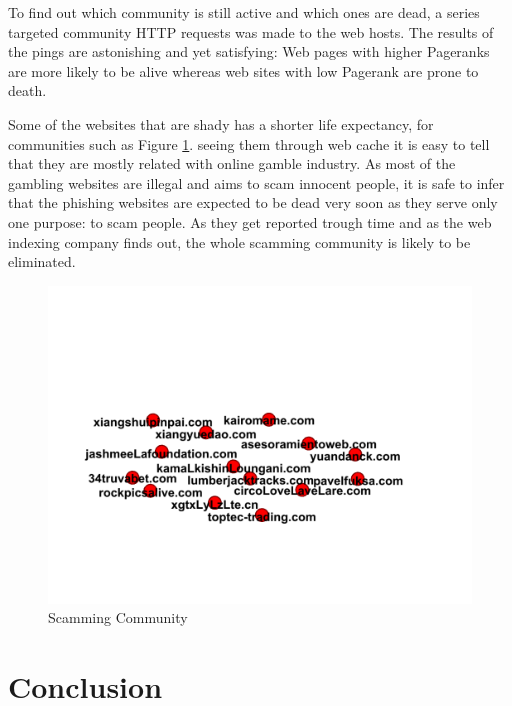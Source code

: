 \documentclass[conference]{IEEEtran}
\begin{document}
To find out which community is still active and which ones are dead, 
a series targeted community HTTP requests was made to the web hosts. 
The results of the pings are astonishing and yet satisfying: 
Web pages with higher Pageranks\cite{ilprints422} are more likely to be alive whereas web sites with low Pagerank are prone to death.

Some of the websites that are shady has a shorter life expectancy, 
for communities such as Figure \ref{fig:dead}.
seeing them through web cache it is easy to tell that they are mostly related with online gamble industry. 
As most of the gambling websites are illegal and aims to scam innocent people, 
it is safe to infer that the phishing websites are expected to be dead very soon as they serve only one purpose: 
to scam people. 
As they get reported trough time and as the web indexing company finds out, 
the whole scamming community is likely to be eliminated.

\begin{figure}[!h]
 \centerline{\includegraphics[width=\columnwidth]{figs/07after.png}}
 \caption{Scamming Community} 
 \label{fig:dead}
\end{figure}

\section{Conclusion}
\lipsum[2-4]




\end{document}
